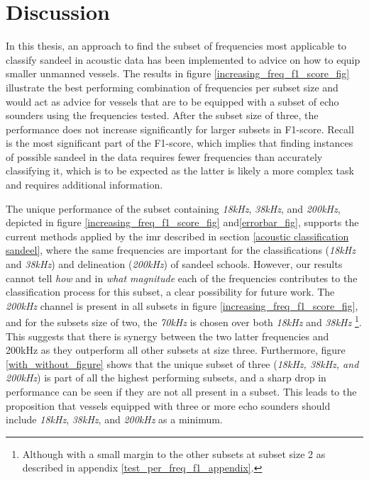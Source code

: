 \chapter{Discussion}
    
    In this thesis, an approach to find the subset of frequencies most applicable to classify sandeel in acoustic data has been implemented to advice on how to equip smaller unmanned vessels. The results in figure  \ref{increasing_freq_f1_score_fig} illustrate the best performing combination of frequencies per subset size and would act as advice for vessels that are to be equipped  with a subset of echo sounders using the frequencies tested. After the subset size of three, the performance does not increase significantly for larger subsets in F1-score. Recall is the most significant part of the F1-score, which implies that finding instances of possible sandeel in the data requires fewer frequencies than accurately classifying it, which is to be expected as the latter is likely a more complex task and requires additional information. 
    
    
    


    The unique performance of the subset containing \textit{18kHz}, \textit{38kHz}, and \textit{200kHz}, depicted in figure \ref{increasing_freq_f1_score_fig} and\ref{errorbar_fig}, supports the current methods applied by the \gls{imr} described in section \ref{acoustic classification sandeel}, where the same frequencies are important for the classifications (\textit{18kHz} and \textit{38kHz}) and delineation (\textit{200kHz}) of sandeel schools. However, our results cannot tell \textit{how} and in \textit{what magnitude} each of the frequencies contributes to the classification process for this subset, a clear possibility for future work. The \textit{200kHz} channel is present in all subsets in figure \ref{increasing_freq_f1_score_fig}, and for the subsets size of two, the \textit{70kHz}  is chosen over both \textit{18kHz} and \textit{38kHz} \footnote{Although with a small margin to the other subsets at subset size 2 as described in appendix \ref{test_per_freq_f1_appendix}.}. This suggests that there is synergy between the two latter frequencies and 200kHz as they outperform all other subsets at size three. Furthermore, figure \ref{with_without_figure} shows that the unique subset of three (\textit{\textit{18kHz}, \textit{38kHz}, and \textit{200kHz}}) is part of all the highest performing subsets, and a sharp drop in performance can be seen if they are not all present in a subset. This leads to the proposition that vessels equipped with three or more echo sounders should include \textit{18kHz}, \textit{38kHz}, and \textit{200kHz} as a minimum. 


